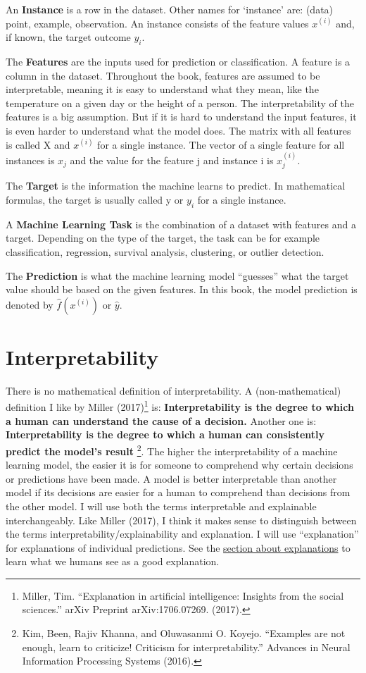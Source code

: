 \documentclass[12pt,]{krantz}
\begin{document}
An \textbf{Instance} is a row in the dataset. Other names for `instance'
are: (data) point, example, observation. An instance consists of the
feature values \(x^{(i)}\) and, if known, the target outcome \(y_i\).

The \textbf{Features} are the inputs used for prediction or
classification. A feature is a column in the dataset. Throughout the
book, features are assumed to be interpretable, meaning it is easy to
understand what they mean, like the temperature on a given day or the
height of a person. The interpretability of the features is a big
assumption. But if it is hard to understand the input features, it is
even harder to understand what the model does. The matrix with all
features is called X and \(x^{(i)}\) for a single instance. The vector
of a single feature for all instances is \(x_j\) and the value for the
feature j and instance i is \(x^{(i)}_j\).

The \textbf{Target} is the information the machine learns to predict. In
mathematical formulas, the target is usually called y or \(y_i\) for a
single instance.

A \textbf{Machine Learning Task} is the combination of a dataset with
features and a target. Depending on the type of the target, the task can
be for example classification, regression, survival analysis,
clustering, or outlier detection.

The \textbf{Prediction} is what the machine learning model ``guesses''
what the target value should be based on the given features. In this
book, the model prediction is denoted by \(\hat{f}(x^{(i)})\) or
\(\hat{y}\).

\hypertarget{interpretability}{\chapter{Interpretability}\label{interpretability}}

There is no mathematical definition of interpretability. A
(non-mathematical) definition I like by Miller (2017)\footnote{Miller,
  Tim. ``Explanation in artificial intelligence: Insights from the
  social sciences.'' arXiv Preprint arXiv:1706.07269. (2017).} is:
\textbf{Interpretability is the degree to which a human can understand
the cause of a decision.} Another one is: \textbf{Interpretability is
the degree to which a human can consistently predict the model's result}
\footnote{Kim, Been, Rajiv Khanna, and Oluwasanmi O. Koyejo. ``Examples
  are not enough, learn to criticize! Criticism for interpretability.''
  Advances in Neural Information Processing Systems (2016).}. The higher
the interpretability of a machine learning model, the easier it is for
someone to comprehend why certain decisions or predictions have been
made. A model is better interpretable than another model if its
decisions are easier for a human to comprehend than decisions from the
other model. I will use both the terms interpretable and explainable
interchangeably. Like Miller (2017), I think it makes sense to
distinguish between the terms interpretability/explainability and
explanation. I will use ``explanation'' for explanations of individual
predictions. See the \protect\hyperlink{explanation}{section about
explanations} to learn what we humans see as a good explanation.
\end{document}
